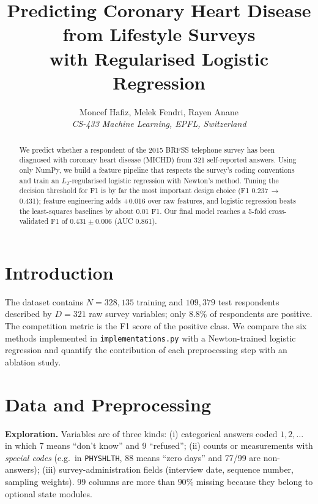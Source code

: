 \documentclass[10pt,conference,compsocconf]{IEEEtran}
\begin{document}
\title{Predicting Coronary Heart Disease from Lifestyle Surveys\\with Regularised Logistic Regression}

\author{
  Moncef Hafiz, Melek Fendri, Rayen Anane\\
  \textit{CS-433 Machine Learning, EPFL, Switzerland}
}

\maketitle

\begin{abstract}
We predict whether a respondent of the 2015 BRFSS telephone survey has been
diagnosed with coronary heart disease (MICHD) from 321 self-reported answers.
Using only NumPy, we build a feature pipeline that respects the survey's
coding conventions and train an $L_2$-regularised logistic regression with
Newton's method. Tuning the decision threshold for F1 is by far the most
important design choice (F1 0.237$\,\to\,$0.431); feature engineering adds
+0.016 over raw features, and logistic regression beats the least-squares
baselines by about 0.01 F1. Our final model reaches a 5-fold cross-validated
F1 of $0.431\pm0.006$ (AUC 0.861).
\end{abstract}

\section{Introduction}
The dataset contains $N=328{,}135$ training and $109{,}379$ test respondents
described by $D=321$ raw survey variables; only $8.8\%$ of respondents are
positive. The competition metric is the F1 score of the positive class. We
compare the six methods implemented in \texttt{implementations.py} with a
Newton-trained logistic regression and quantify the contribution of each
preprocessing step with an ablation study.

\section{Data and Preprocessing}
\label{sec:prep}
\textbf{Exploration.} Variables are of three kinds: (i) categorical answers
coded $1,2,\dots$ in which 7 means ``don't know'' and 9 ``refused'';
(ii) counts or measurements with \emph{special codes} (e.g.\ in
\texttt{PHYSHLTH}, 88 means ``zero days'' and 77/99 are non-answers);
(iii) survey-administration fields (interview date, sequence number,
sampling weights). 99 columns are more than $90\%$ missing because they
belong to optional state modules.
\end{document}
